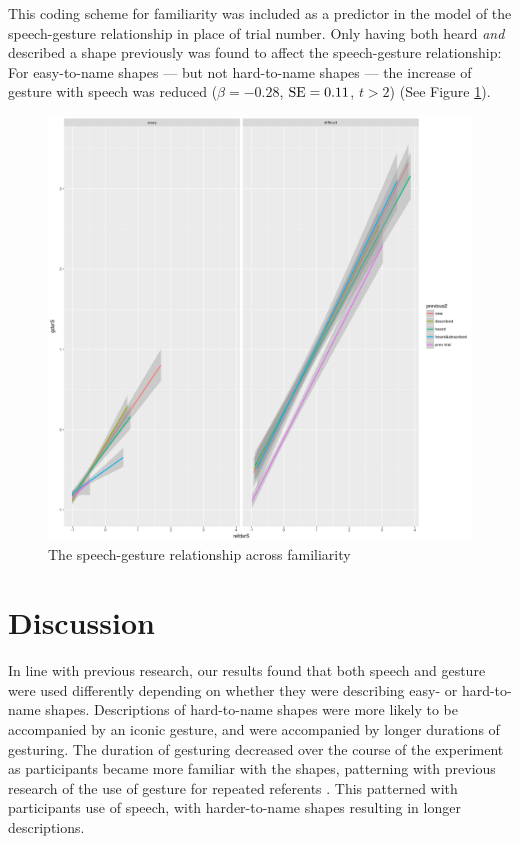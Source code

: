 \documentclass[a4paper,man,natbib]{apa6}
\newcommand{\resultsLM}[3]{$\beta = #1$, $\textnormal{SE} = #2$, $t #3$}
\begin{document}
This coding scheme for familiarity was included as a predictor in the model of the speech-gesture relationship in place of trial number. 
Only having both heard \textit{and} described a shape previously was found to affect the speech-gesture relationship: For easy-to-name shapes --- but not hard-to-name shapes --- the increase of gesture with speech was reduced (\resultsLM{-0.28}{0.11}{>2}) (See Figure \ref{fig:prev}).

\begin{figure}
  \centering
	\includegraphics[width=\linewidth]{prev_plot.png}
  \caption{The speech-gesture relationship across familiarity}
  \label{fig:prev}
\end{figure}


\section{Discussion}
In line with previous research, our results found that both speech and gesture were used differently depending on whether they were describing easy- or hard-to-name shapes. 
Descriptions of hard-to-name shapes were more likely to be accompanied by an iconic gesture, and were accompanied by longer durations of gesturing. 
The duration of gesturing decreased over the course of the experiment as participants became more familiar with the shapes, patterning with previous research of the use of gesture for repeated referents \citep{Hoetjes2015}.
This patterned with participants use of speech, with harder-to-name shapes resulting in longer descriptions.
\end{document}
